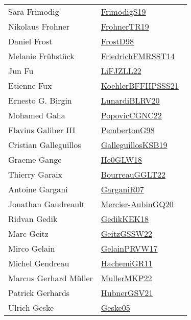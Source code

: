 {\begin{longtable}{p{4cm}p{20cm}}
Sara Frimodig & \href{papers/FrimodigS19.pdf}{FrimodigS19}~\cite{FrimodigS19}\\
Nikolaus Frohner & \href{papers/FrohnerTR19.pdf}{FrohnerTR19}~\cite{FrohnerTR19}\\
Daniel Frost & \href{papers/FrostD98.pdf}{FrostD98}~\cite{FrostD98}\\
Melanie Fr{\"{u}}hst{\"{u}}ck & \href{}{FriedrichFMRSST14}~\cite{FriedrichFMRSST14}\\
Jun Fu & \href{papers/LiFJZLL22.pdf}{LiFJZLL22}~\cite{LiFJZLL22}\\
Etienne Fux & \href{articles/KoehlerBFFHPSSS21.pdf}{KoehlerBFFHPSSS21}~\cite{KoehlerBFFHPSSS21}\\
Ernesto G. Birgin & \href{articles/LunardiBLRV20.pdf}{LunardiBLRV20}~\cite{LunardiBLRV20}\\
Mohamed Gaha & \href{papers/PopovicCGNC22.pdf}{PopovicCGNC22}~\cite{PopovicCGNC22}\\
Flavius Galiber III & \href{papers/PembertonG98.pdf}{PembertonG98}~\cite{PembertonG98}\\
Cristian Galleguillos & \href{papers/GalleguillosKSB19.pdf}{GalleguillosKSB19}~\cite{GalleguillosKSB19}\\
Graeme Gange & \href{papers/He0GLW18.pdf}{He0GLW18}~\cite{He0GLW18}\\
Thierry Garaix & \href{articles/BourreauGGLT22.pdf}{BourreauGGLT22}~\cite{BourreauGGLT22}\\
Antoine Gargani & \href{papers/GarganiR07.pdf}{GarganiR07}~\cite{GarganiR07}\\
Jonathan Gaudreault & \href{papers/Mercier-AubinGQ20.pdf}{Mercier-AubinGQ20}~\cite{Mercier-AubinGQ20}\\
Ridvan Gedik & \href{articles/GedikKEK18.pdf}{GedikKEK18}~\cite{GedikKEK18}\\
Marc Geitz & \href{papers/GeitzGSSW22.pdf}{GeitzGSSW22}~\cite{GeitzGSSW22}\\
Mirco Gelain & \href{papers/GelainPRVW17.pdf}{GelainPRVW17}~\cite{GelainPRVW17}\\
Michel Gendreau & \href{articles/HachemiGR11.pdf}{HachemiGR11}~\cite{HachemiGR11}\\
Marcus Gerhard M{\"{u}}ller & \href{articles/MullerMKP22.pdf}{MullerMKP22}~\cite{MullerMKP22}\\
Patrick Gerhards & \href{articles/HubnerGSV21.pdf}{HubnerGSV21}~\cite{HubnerGSV21}\\
Ulrich Geske & \href{papers/Geske05.pdf}{Geske05}~\cite{Geske05}\\

\end{longtable}}
